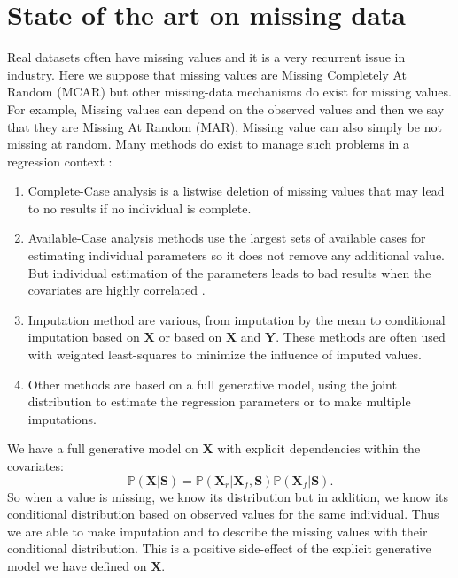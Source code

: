 \documentclass[12pt,a4paper]{report}
\begin{document}
		 \section{State of the art on missing data}
	Real datasets often have missing values and it is a very recurrent issue in industry. 
			Here we suppose that missing values are Missing Completely At Random (MCAR) but other missing-data mechanisms do exist for missing values. For example, Missing values can depend on the observed values and then we say that they are Missing At Random (MAR), Missing value can also simply be not missing at random.
	 Many methods do exist to manage such problems in a regression context \cite{little1992regression}:
	 \begin{enumerate}
	\item Complete-Case analysis is a listwise deletion of missing values that may lead to no results if no individual is complete.  	
	\item Available-Case analysis methods use the largest sets of available cases for estimating individual parameters so it does not remove any additional value. But individual estimation of the parameters leads to bad results when the covariates are highly correlated \cite{haitovsky1968missing}.
	\item Imputation method are various, from imputation by the mean to conditional imputation based on $\boldsymbol{X}$ or based on $\boldsymbol{X}$ and $\boldsymbol{Y}$. These methods are often used with weighted least-squares to minimize the influence of imputed values.
	\item Other methods are based on a full generative model, using the joint distribution to estimate the regression parameters or to make multiple imputations.
	\end{enumerate} 
%	 
%	 
	We have a full generative model on $\boldsymbol{X}$ with explicit dependencies within the covariates:
	\begin{equation*}
	\mathbb{P}(\boldsymbol{X}|\boldsymbol{S})=\mathbb{P}(\boldsymbol{X}_r|\boldsymbol{X}_f,\boldsymbol{S})\mathbb{P}(\boldsymbol{X}_f|\boldsymbol{S}).
\end{equation*}	 
So when a value is missing, we know its distribution but in addition, we know its conditional distribution based on observed values for the same individual. Thus we are able to make imputation and to describe the missing values with their conditional distribution. This is a positive side-effect of the explicit generative model we have defined on $\boldsymbol{X}$.\\
		
\end{document}
